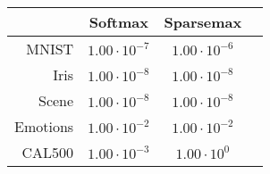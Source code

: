 \begin{tabular}{r|ccc}
& Softmax & Sparsemax \\
\hline
MNIST & $1.00 \cdot 10^{-7}$ & $1.00 \cdot 10^{-6}$ \\
Iris & $1.00 \cdot 10^{-8}$ & $1.00 \cdot 10^{-8}$ \\
Scene & $1.00 \cdot 10^{-8}$ & $1.00 \cdot 10^{-8}$ \\
Emotions & $1.00 \cdot 10^{-2}$ & $1.00 \cdot 10^{-2}$ \\
CAL500 & $1.00 \cdot 10^{-3}$ & $1.00 \cdot 10^{0}$ \\
\end{tabular}
